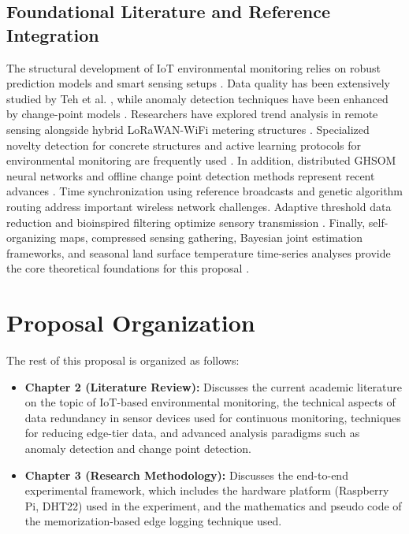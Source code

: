 \subsection{Foundational Literature and Reference Integration}
The structural development of IoT environmental monitoring relies on robust prediction models and smart sensing setups \cite{ref1, ref2, ref21, ref22, ref41, ref42}. Data quality has been extensively studied by Teh et al. \cite{ref3, ref23, ref43}, while anomaly detection techniques have been enhanced by change-point models \cite{ref4, ref5, ref24, ref25, ref44, ref45}. Researchers have explored trend analysis in remote sensing \cite{ref6, ref26, ref46} alongside hybrid LoRaWAN-WiFi metering structures \cite{ref7, ref27, ref47}. Specialized novelty detection for concrete structures and active learning protocols for environmental monitoring are frequently used \cite{ref8, ref9, ref28, ref29, ref48, ref49}. In addition, distributed GHSOM neural networks and offline change point detection methods represent recent advances \cite{ref10, ref11, ref12, ref30, ref31, ref32, ref50, ref51, ref52}. Time synchronization using reference broadcasts \cite{ref13, ref33, ref53} and genetic algorithm routing \cite{ref14, ref34, ref54} address important wireless network challenges. Adaptive threshold data reduction and bioinspired filtering optimize sensory transmission \cite{ref15, ref16, ref35, ref36, ref55, ref56}. Finally, self-organizing maps, compressed sensing gathering, Bayesian joint estimation frameworks, and seasonal land surface temperature time-series analyses provide the core theoretical foundations for this proposal \cite{ref17, ref18, ref19, ref20, ref37, ref38, ref39, ref40, ref57, ref58, ref59, ref60}.

\section{Proposal Organization}
The rest of this proposal is organized as follows:
\begin{itemize}
    \item \textbf\textbf{Chapter 2 (Literature Review):} Discusses the current academic literature on the topic of IoT-based environmental monitoring, the technical aspects of data redundancy in sensor devices used for continuous monitoring, techniques for reducing edge-tier data, and advanced analysis paradigms such as anomaly detection and change point detection.
   \item \textbf{Chapter 3 (Research Methodology):} Discusses the end-to-end experimental framework, which includes the hardware platform (Raspberry Pi, DHT22) used in the experiment, and the mathematics and pseudo code of the memorization-based edge logging technique used.
\end{itemize}
